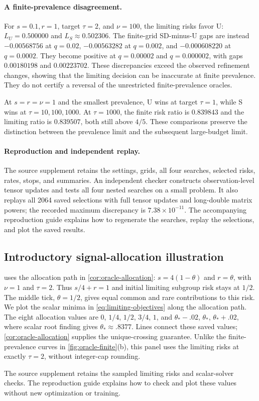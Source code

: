 \paragraph{A finite-prevalence disagreement.}

For $s = 0.1,r = 1$, target $\tau = 2$, and $\nu = 100$, the limiting risks
favor U: $L_U = 0.500000$ and $L_S \approx 0.502306$. The finite-grid SD-minus-U
gaps are instead $-0.00568756$ at $q = 0.02$, $-0.00563282$ at $q = 0.002$, and
$-0.000608220$ at $q = 0.0002$. They become positive at $q = 0.00002$ and
$q = 0.000002$, with gaps $0.00180198$ and $0.00223702$. These discrepancies
exceed the observed refinement changes, showing that the limiting decision can
be inaccurate at finite prevalence. They do not certify a reversal of the
unrestricted finite-prevalence oracles.

At $s = r = \nu = 1$ and the smallest prevalence, U wins at target $\tau = 1$,
while S wins at $\tau = 10,100,1000$. At $\tau = 1000$, the finite risk ratio is
$0.839843$ and the limiting ratio is $0.839507$, both still above $4/5$. These
comparisons preserve the distinction between the prevalence limit and the
subsequent large-budget limit.

\paragraph{Reproduction and independent replay.}

The source supplement retains the settings, grids, all four searches, selected
risks, rates, stops, and summaries. An independent checker constructs
observation-level tensor updates and tests all four nested searches on a small
problem. It also replays all 2064 saved selections with full tensor updates and
long-double matrix powers; the recorded maximum discrepancy is
$7.38 \times 10^{-11}$. The accompanying reproduction guide explains how to
regenerate the searches, replay the selections, and plot the saved results.

\subsection{Introductory signal-allocation illustration}
\label{sec:signal-allocation}

 uses the allocation path in
\cref{cor:oracle-allocation}: $s = 4(1 - \theta)$ and $r = \theta$, with
$\nu = 1$ and $\tau = 2$. Thus $s/4 + r = 1$ and initial limiting subgroup risk
stays at $1/2$. The middle tick, $\theta = 1/2$, gives equal common and rare
contributions to this risk. We plot the scalar minima in
\cref{eq:limiting-objectives} along the allocation path. The eight
allocation values are $0$, $1/4$, $1/2$, $3/4$, $1$, and $\theta_* - .02$,
$\theta_*$, $\theta_* + .02$, where scalar root finding gives
$\theta_* \approx .8377$. Lines connect these saved values;
\cref{cor:oracle-allocation} supplies the unique-crossing guarantee. Unlike the
finite-prevalence curves in \cref{fig:oracle-finite}(b), this panel uses the
limiting risks at exactly $\tau = 2$, without integer-cap rounding.

The source supplement retains the sampled limiting risks and scalar-solver
checks. The reproduction guide explains how to check and plot these values
without new optimization or training.

